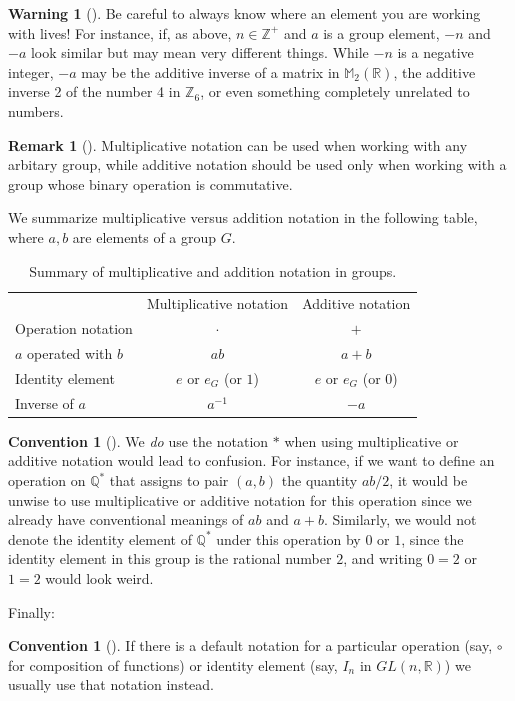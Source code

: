 \documentclass[10pt,openany,oneside]{book}
\theoremstyle{plain}
\theoremstyle{definition}
\theoremstyle{definition}
\newtheorem{remark}[theorem]{Remark}
\newtheorem{convention}[theorem]{Convention}
\newtheorem{warning}[theorem]{Warning}
\theoremstyle{definition}
\theoremstyle{definition}
\numberwithin{equation}{section}
\newcommand{\hrulemedium}{\noalign{\hrule height 0.07em}}
\def\Z{\mathbb{Z}}
\def\R{\mathbb{R}}
\def\Q{\mathbb{Q}}
\def\M{\mathbb{M}}
\begin{document}
\begin{warning}[]\label{warning-7}
Be careful to always know where an element you are working with lives! For instance, if, as above, \(n\in
\Z^+\) and \(a\) is a group element, \(-n\) and \(-a\) look similar but may mean very different things. While \(-n\) is a negative integer, \(-a\) may be the additive inverse of a matrix in \(\M_2(\R)\), the additive inverse 2 of the number 4 in \(\Z_6\), or even something completely unrelated to numbers.%
\end{warning}
\begin{remark}[]\label{remark-9}
Multiplicative notation can be used when working with any arbitary group, while additive notation should be used only when working with a group whose binary operation is commutative.%
\end{remark}
We summarize multiplicative versus addition notation in the following table, where \(a,b\) are elements of a group \(G\).%
\begin{table}
\centering
\begin{tabular}{lll}
\multicolumn{1}{c}{}&\multicolumn{1}{c}{Multiplicative notation}&\multicolumn{1}{c}{Additive notation}\tabularnewline\hrulemedium
Operation notation&\multicolumn{1}{c}{\(\cdot\)}&\multicolumn{1}{c}{\(+\)}\tabularnewline[0pt]
\(a\) operated with \(b\)&\multicolumn{1}{c}{\(ab\)}&\multicolumn{1}{c}{\(a+b\)}\tabularnewline[0pt]
Identity element&\multicolumn{1}{c}{\(e\) or \(e_G\) (or \(1\))}&\multicolumn{1}{c}{\(e\) or \(e_G\) (or \(0\))}\tabularnewline[0pt]
Inverse of \(a\)&\multicolumn{1}{c}{\(a^{-1}\)}&\multicolumn{1}{c}{\(-a\)}
\end{tabular}
\caption{Summary of multiplicative and addition notation in groups.\label{table-1}}
\end{table}
\begin{convention}[]\label{convention-2}
We \emph{do} use the notation \(*\) when using multiplicative or additive notation would lead to confusion. For instance, if we want to define an operation on \(\Q^*\) that assigns to pair \((a,b)\) the quantity \(ab/2\), it would be unwise to use multiplicative or additive notation for this operation since we already have conventional meanings of \(ab\) and \(a+b\). Similarly, we would not denote the identity element of \(\Q^*\) under this operation by \(0\) or \(1\), since the identity element in this group is the rational number \(2\), and writing \(0=2\) or \(1=2\) would look weird.%
\end{convention}
Finally:%
\begin{convention}[]\label{convention-3}
If there is a default notation for a particular operation (say, \(\circ\) for composition of functions) or identity element (say, \(I_n\) in \(GL(n,\R)\)) we usually use that notation instead.%
\end{convention}
\typeout{************************************************}
\typeout{************************************************}
\end{document}
